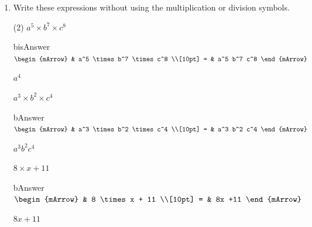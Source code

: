 \clearpage\noindent%
\begin{enumerate}[resume]
  \item Write these expressions without using the multiplication or division symbols.
  \begin{subtask}(2)
    \task[]  $ a^5 \times b^7 \times c^8$
              \begin{envOut}[height=3cm]{bisAnswer}
			       $\begin{mArrow}
			                & a^5 \times b^7 \times c^8      \\[10pt]
                          = & a^5 b^7 c^8	   
	                \end{mArrow}$
              \end{envOut}			  
			  \begin{exercise}\begin{shortsolution}  
				       $a^4$
			  \end{shortsolution}\end{exercise}

    \task[]  $ a^3 \times b^2 \times c^4 $
              \begin{envOut}[height=3cm]{bAnswer}
			       $\begin{mArrow}
			                & a^3 \times b^2 \times c^4      \\[10pt]
                          = & a^3 b^2 c^4	   
	                \end{mArrow}$
              \end{envOut}			  
			  \begin{exercise}\begin{shortsolution}  
				       $a^3 b^2 c^4$
			  \end{shortsolution}\end{exercise}

    \task[]  $ 8 \times x + 11 $
              \begin{envOut}[height=3cm]{bAnswer}
			       $\begin{mArrow}
			                & 8 \times x + 11      \\[10pt]
                          = & 8x +11	   
	                \end{mArrow}$
              \end{envOut}			  
			  \begin{exercise}\begin{shortsolution}  
				       $8x +11$
			  \end{shortsolution}\end{exercise}


\end{subtask}
\end{enumerate}
